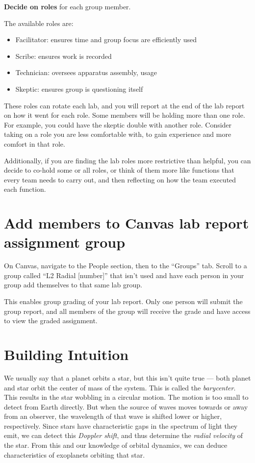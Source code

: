 \begin{steps}
	\item \textbf{Decide on roles} for each group member.
\end{steps}

The available roles are:
\begin{itemize}
	\item Facilitator: ensures time and group focus are efficiently used
	\item Scribe: ensures work is recorded
	\item Technician: oversees apparatus assembly, usage
	\item Skeptic: ensures group is questioning itself
\end{itemize}

These roles can rotate each lab, and you will report at the end of the lab report on how it went for each role. Some members will be holding more than one role. For example, you could have the skeptic double with another role. Consider taking on a role you are less comfortable with, to gain experience and more comfort in that role.

Additionally, if you are finding the lab roles more restrictive than helpful, you can decide to co-hold some or all roles, or think of them more like functions that every team needs to carry out, and then reflecting on how the team executed each function.

\section{Add members to Canvas lab report assignment group}

\begin{steps}
	\item On Canvas, navigate to the People section, then to the ``Groups'' tab. Scroll to a group called ``L2 Radial [number]'' that isn't used and have each person in your group add themselves to that same lab group.
\end{steps}

This enables group grading of your lab report. Only one person will submit the group report, and all members of the group will receive the grade and have access to view the graded assignment.

\section{Building Intuition}

We usually say that a planet orbits a star, but this isn't quite true --- both planet and star orbit the center of mass of the system. This is called the \textit{barycenter}. This results in the star wobbling in a circular motion. The motion is too small to detect from Earth directly. But when the source of waves moves towards or away from an observer, the wavelength of that wave is shifted lower or higher, respectively. Since stars have characteristic gaps in the spectrum of light they emit, we can detect this \textit{Doppler shift}, and thus determine the \textit{radial velocity} of the star. From this and our knowledge of orbital dynamics, we can deduce characteristics of exoplanets orbiting that star.

